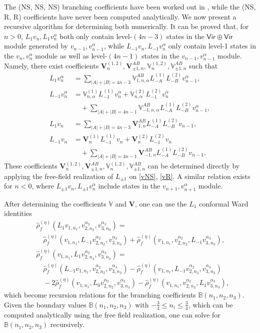 \documentclass[aps,10pt,twocolumn,superscriptaddress]{revtex4-2}
\def\ie{\begin{equation}\begin{aligned}}
\def\fe{\end{aligned}\end{equation}}
\begin{document}
The (NS, NS, NS) branching coefficients have been worked out in \cite{Hadasz:2013dza}, while the (NS, R, R) coefficients have never been computed analytically. We now present a recursive algorithm for determining both numerically. It can be proved that, for $n> 0$, $L_1 v_n, L_{1}v_n^\alpha$ both only contain level-$(4n-3)$ states in the $\mathsf{Vir\oplus Vir}$ module generated by $v_{n-1}, v_{n-1}^\alpha$, while $L_{-1}v_n, L_{-1}v_n^\alpha$ only contain level-1 states in the $v_n, v_n^\alpha$ module as well as level-$(4n-1)$ states in the $v_{n-1}, v_{n-1}^\alpha$ module. Namely, there exist coefficients $\mathbf{V}_n^{(1,2)}, \mathbf{V}_{\pm 1, n}^{AB}, \mathbb{V}_n^{(1,2)}, \mathbb{V}_{\pm 1, n}^{AB}$ such that
\ie \label{Vcoeffs}
L_1 v_n^\alpha &= \sum_{|A|+|B|=4n-3} \mathbb{V}_{1,n,\alpha}^{AB} L_{-A}^{(1)}L_{-B}^{(2)} v_{n-1}^\alpha,\\
L_{-1} v_n^\alpha &= \mathbb{V}_{n,\alpha}^{(1)} L_{-1}^{(1)}v_n^\alpha + \mathbb{V}_{n,\alpha}^{(2)} L_{-1}^{(2)}v_n^\alpha\\
&\quad + \sum_{|A|+|B|=4n-1} \mathbb{V}_{-1,n,\alpha}^{AB} L_{-A}^{(1)}L_{-B}^{(2)} v_{n-1}^\alpha,\\
L_1 v_n &= \sum_{|A|+|B|=4n-3} \mathbf{V}_{1,n}^{AB} L_{-A}^{(1)}L_{-B}^{(2)} v_{n-1},\\
L_{-1} v_n &= \mathbf{V}_{n}^{(1)} L_{-1}^{(1)}v_n + \mathbf{V}_{n}^{(2)} L_{-1}^{(2)}v_n \\
&\quad + \sum_{|A|+|B|=4n-1} \mathbf{V}_{-1,n}^{AB} L_{-A}^{(1)}L_{-B}^{(2)} v_{n-1}.
\fe
These coefficients $\mathbf{V}_n^{(1,2)}, \mathbf{V}_{\pm 1, n}^{AB}, \mathbb{V}_n^{(1,2)}, \mathbb{V}_{\pm 1, n}^{AB}$ can be determined directly by applying the free-field realization of $L_{\pm 1}$ on \eqref{vNS}, \eqref{vR}. A similar relation exists for $n< 0$, where $L_{\pm 1}v_n, L_{\pm 1}v_n^\alpha$ include states in the $v_{n+1}, v_{n+1}^\alpha$ module.

After determining the coefficients $\mathbb{V}$ and $\mathbf{V}$, one can use the $L_1$ conformal Ward identities
\ie
&\hat{\rho}_f^{(\eta)}(L_1v_{1,n_1},v_{2,n_2}^{\alpha_2},v_{3,n_3}^{\alpha_3})=\\
&\quad \hat{\rho}_f^{(\eta)}(v_{1,n_1},L_{-1}v_{2,n_2}^{\alpha_2},v_{3,n_3}^{\alpha_3})+\hat{\rho}_f^{(\eta)}(v_{1,n_1},v_{2,n_2}^{\alpha_2},L_{-1}v_{3,n_3}^{\alpha_3}),\\
&\hat{\rho}_f^{(\eta)}(v_{1,n_1},L_1v_{2,n_2}^{\alpha_2},v_{3,n_3}^{\alpha_3})=\\
&\quad \hat{\rho}_f^{(\eta)}(L_{-1}v_{1,n_1},v_{2,n_2}^{\alpha_2},v_{3,n_3}^{\alpha_3})-\hat{\rho}_f^{(\eta)}(v_{1,n_1},L_{-1}v_{2,n_2}^{\alpha_2},v_{3,n_3}^{\alpha_3})\\
&\quad -2\hat{\rho}_f^{(\eta)}(v_{1,n_1},L_0v_{2,n_2}^{\alpha_2},v_{3,n_3}^{\alpha_3})-\hat{\rho}_f^{(\eta)}(v_{1,n_1},v_{2,n_2}^{\alpha_2},L_1v_{3,n_3}^{\alpha_3}),
\fe
which become recursion relations for the branching coefficients $\mathbb{B}(n_1, n_2, n_3)$. Given the boundary values $\mathbb{B}(n_1, n_2, n_3)$ with $-\frac{3}{4}\leq n_i \leq \frac{3}{4}$, which can be computed analytically using the free field realization, one can solve for $\mathbb{B}(n_1, n_2, n_3)$ recursively. 
\end{document}
